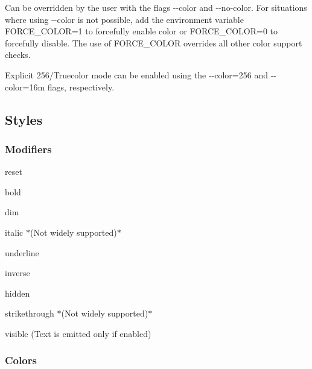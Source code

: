 Can be overridden by the user with the flags {\ttfamily -\/-\/color} and {\ttfamily -\/-\/no-\/color}. For situations where using {\ttfamily -\/-\/color} is not possible, add the environment variable {\ttfamily F\+O\+R\+C\+E\+\_\+\+C\+O\+L\+OR=1} to forcefully enable color or {\ttfamily F\+O\+R\+C\+E\+\_\+\+C\+O\+L\+OR=0} to forcefully disable. The use of {\ttfamily F\+O\+R\+C\+E\+\_\+\+C\+O\+L\+OR} overrides all other color support checks.

Explicit 256/\+Truecolor mode can be enabled using the {\ttfamily -\/-\/color=256} and {\ttfamily -\/-\/color=16m} flags, respectively.

\subsection*{Styles}

\subsubsection*{Modifiers}


\begin{DoxyItemize}
\item {\ttfamily reset}
\item {\ttfamily bold}
\item {\ttfamily dim}
\item {\ttfamily italic} $\ast$(Not widely supported)$\ast$
\item {\ttfamily underline}
\item {\ttfamily inverse}
\item {\ttfamily hidden}
\item {\ttfamily strikethrough} $\ast$(Not widely supported)$\ast$
\item {\ttfamily visible} (Text is emitted only if enabled)
\end{DoxyItemize}

\subsubsection*{Colors}


